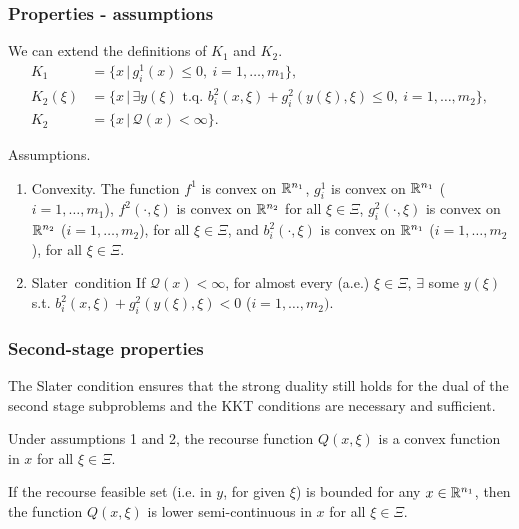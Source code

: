 \documentclass[french]{beamer}
\begin{document}
\begin{frame}
	\frametitle{Properties - assumptions}
	
	We can extend the definitions of $K_1$ and $K_2$.
	\begin{align*}
		K_1 &= \lbrace x \,|\, g_i^1(x) \leq 0,\ i = 1,\ldots,m_1 \rbrace,\\
		K_2(\xi) &= \lbrace x \,|\, \exists y(\xi) \mbox{ t.q. } b_i^2(x,\xi) +
		g_i^2(y(\xi),\xi) \leq 0,\ i = 1,\ldots,m_2 \rbrace,\\
		K_2 &= \lbrace x \,|\, \mathcal{Q}(x) < \infty \rbrace.
	\end{align*}
	
	{\blue Assumptions}.
	\begin{enumerate}
		\item \mbox{\red Convexity}.
		The function $f^1$ is convex on $\mathbb{R}^{n_1}$, $g_i^1$ is convex on $\mathbb{R}^{n_1}$ ($i =
		1,\ldots,m_1$), $f^2(\cdot,\xi)$ is convex on $\mathbb{R}^{n_2}$ for all $\xi \in \Xi$, $g_i^2(\cdot,\xi)$ is convex on $\mathbb{R}^{n_2}$ ($i = 1,\ldots,m_2$), for all $\xi \in \Xi$, and $b_i^2(\cdot, \xi)$ is convex on $\mathbb{R}^{n_1}$ ($i = 1,\ldots,m_2$), for all $\xi \in \Xi$.
		\item \mbox{\red Slater condition}
		If $\mathcal{Q}(x) < \infty$, for almost every (a.e.) $\xi \in \Xi$, $\exists$ some $y(\xi)$ s.t. $b_i^2(x, \xi) + g_i^2(y(\xi), \xi) < 0$ ($i = 1,\ldots,m_2)$.
	\end{enumerate}
	
\end{frame}

\begin{frame}
\frametitle{Second-stage properties}

The Slater condition ensures that the strong duality still holds for the dual of the second stage subproblems and the KKT conditions are necessary and sufficient.

\mbox{}

\begin{theorem}
Under assumptions 1 and 2, the recourse function $Q(x,\xi)$ is a convex function in $x$ for all $\xi \in \Xi$.
\end{theorem}

\begin{theorem}
If the recourse feasible set (i.e. in $y$, for given $\xi$) is bounded for any $x \in \mathbb{R}^{n_1}$, then the function $Q(x,\xi)$ is lower semi-continuous in $x$ for all $\xi \in \Xi$.
\end{theorem}

\end{frame}
\end{document}
